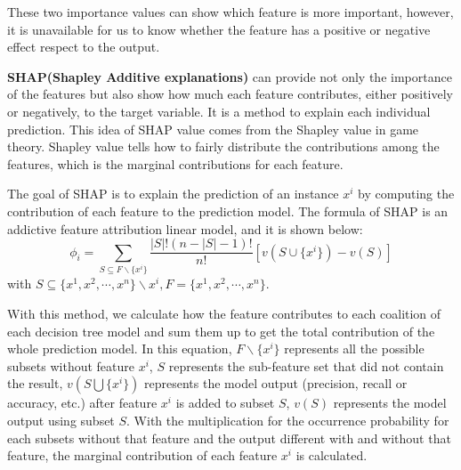 \documentclass{article}
\begin{document}
These two importance values can show which feature is more important, however, it is unavailable for us to know whether the feature has a positive or negative effect respect to the output.


\par\noindent\textbf{SHAP(Shapley Additive explanations)} can provide not only the importance of the features but also
show how much each feature contributes, either positively or negatively, to the target variable.
 It is a method to explain each individual prediction. This idea of SHAP value comes from the Shapley value in game theory. Shapley value tells how to fairly distribute the contributions among the features, which is the marginal contributions for each feature\cite{shap1953definition}. 

The goal of SHAP is to explain the prediction of an instance ${x}^{i}$ by computing the contribution of each feature to the prediction model. The formula of SHAP is an addictive feature attribution linear model, and it is shown below:
\begin{equation}
    {{\phi }_{i}}=\sum\limits_{S\subseteq F\backslash{\{{x}^{i}\}}}{\frac{|S|!(n-|S|-1)!}{n!}}\left[v(S\cup \{{x}^{i}\})-v(S)\right] 
\nonumber\end{equation}
 with  $ S\subseteq \{{{x}^{1}},{{x}^{2}},\cdots ,{{x}^{n}}\}\backslash {{x}^{i}},F = \{{{x}^{1}},{{x}^{2}},\cdots ,{{x}^{n}}\}.$
 
 With this method, we calculate how the feature contributes to each coalition of each decision tree model and sum them up to get the total contribution of the whole prediction model. In this equation, $F\backslash{\{{x}^{i}\}}$ represents all the possible subsets without feature ${x}^{i}$, $S$ represents the sub-feature set that did not contain the result, $v(S\bigcup \{{x}^{i}\})$ represents the model output (precision, recall or accuracy, etc.) after feature ${x}^{i}$ is added to subset $S$, $v(S)$ represents the model output using subset $S$. With the multiplication for the occurrence probability for each subsets without that feature and the output different with and without that feature, the marginal contribution of each feature ${x}^{i}$ is calculated.
 
\end{document}
